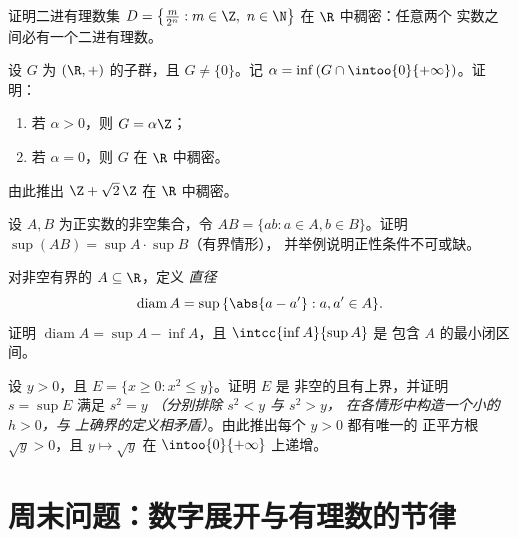\begin{exercise}[$\star\star$]\label{exo:b1:reals:8}
证明二进有理数集 $D = \bigl\{\frac{m}{2^n} : m \in \Z,\ n \in
\N\bigr\}$ 在 $\R$ 中稠密：任意两个
实数之间必有一个二进有理数。
\end{exercise}

\begin{exercise}[$\star\star\star$]\label{exo:b1:reals:9}
设 $G$ 为 $(\R, +)$ 的子群，且 $G \neq \{0\}$。记 $\alpha =
\inf\,(G \cap \intoo{0}{+\infty})$。证明：
\begin{enumerate}
  \item 若 $\alpha > 0$，则 $G = \alpha\Z$；
  \item 若 $\alpha = 0$，则 $G$ 在 $\R$ 中稠密。
\end{enumerate}
由此推出 $\Z + \sqrt 2\,\Z$ 在 $\R$ 中稠密。
\end{exercise}

\begin{exercise}[$\star\star\star$]\label{exo:b1:reals:10}
设 $A, B$ 为正实数的非空集合，令 $AB = \{ab : a \in
A, b \in B\}$。证明 $\sup(AB) = \sup A \cdot \sup B$（有界情形），
并举例说明正性条件不可或缺。
\end{exercise}

\begin{exercise}[$\star\star$]\label{exo:b1:reals:11}
对非空有界的 $A \subseteq \R$，定义
\emph{直径}
\[
\operatorname{diam} A = \sup\,\{\abs{a - a'} : a, a' \in A\} .
\]
证明 $\operatorname{diam} A = \sup A - \inf A$，且
$\intcc{\inf A}{\sup A}$ 是
包含 $A$ 的最小闭区间。
\end{exercise}

\begin{exercise}[$\star\star\star$]\label{exo:b1:reals:12}
设 $y > 0$，且 $E = \{x \geq 0 : x^2 \leq y\}$。证明 $E$ 是
非空的且有上界，并证明 $s = \sup E$ 满足 $s^2 =
y$ \emph{（分别排除 $s^2 < y$ 与 $s^2 > y$，
在各情形中构造一个小的 $h > 0$，与
上确界的定义相矛盾）}。由此推出每个 $y > 0$ 都有唯一的
正平方根 $\sqrt y > 0$，且 $y \mapsto \sqrt y$ 在
$\intoo{0}{+\infty}$ 上递增。
\end{exercise}

\section{周末问题：数字展开与有理数的节律}

